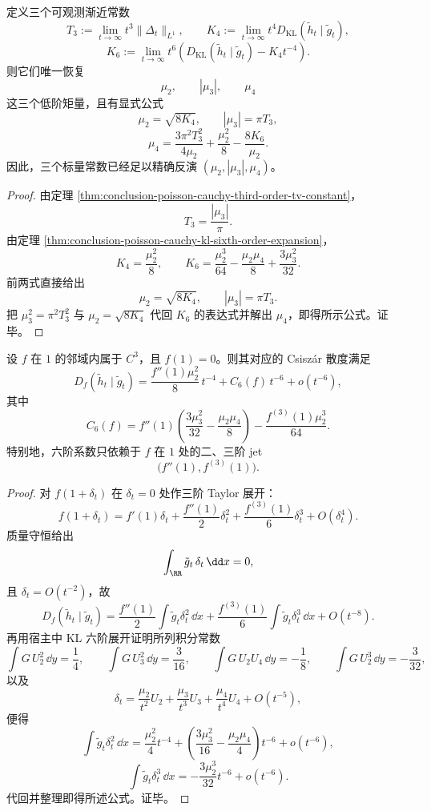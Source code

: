 \begin{theorem}[\((T_3,K_4,K_6)\) 的三常数精确层析]\label{thm:conclusion-poisson-cauchy-three-constant-moment-tomography}
定义三个可观测渐近常数
\[
T_3:=\lim_{t\to\infty}t^3\|\Delta_t\|_{L^1},
\qquad
K_4:=\lim_{t\to\infty}t^4D_{\mathrm{KL}}(\tilde h_t\mid \tilde g_t),
\]
\[
K_6:=\lim_{t\to\infty}t^6\left(D_{\mathrm{KL}}(\tilde h_t\mid \tilde g_t)-K_4t^{-4}\right).
\]
则它们唯一恢复
\[
\mu_2,\qquad |\mu_3|,\qquad \mu_4
\]
这三个低阶矩量，且有显式公式
\[
\mu_2=\sqrt{8K_4},
\qquad
|\mu_3|=\pi T_3,
\]
\[
\mu_4
=
\frac{3\pi^2T_3^2}{4\mu_2}
+\frac{\mu_2^2}{8}
-\frac{8K_6}{\mu_2}.
\]
因此，三个标量常数已经足以精确反演 \((\mu_2,|\mu_3|,\mu_4)\)。
\end{theorem}
\begin{proof}
由定理 \ref{thm:conclusion-poisson-cauchy-third-order-tv-constant}，
\[
T_3=\frac{|\mu_3|}{\pi}.
\]
由定理 \ref{thm:conclusion-poisson-cauchy-kl-sixth-order-expansion}，
\[
K_4=\frac{\mu_2^2}{8},
\qquad
K_6=\frac{\mu_2^3}{64}-\frac{\mu_2\mu_4}{8}+\frac{3\mu_3^2}{32}.
\]
前两式直接给出
\[
\mu_2=\sqrt{8K_4},
\qquad
|\mu_3|=\pi T_3.
\]
把 \(\mu_3^2=\pi^2T_3^2\) 与 \(\mu_2=\sqrt{8K_4}\) 代回 \(K_6\) 的表达式并解出 \(\mu_4\)，即得所示公式。证毕。
\end{proof}

\begin{theorem}\label{thm:conclusion-poisson-cauchy-c3-fdiv-sixth-jet-affine-law}
设 \(f\) 在 \(1\) 的邻域内属于 \(C^3\)，且 \(f(1)=0\)。则其对应的 Csisz\'ar 散度满足
\[
D_f(\tilde h_t\mid \tilde g_t)
=
\frac{f''(1)\mu_2^2}{8}\,t^{-4}
+C_6(f)\,t^{-6}
+o(t^{-6}),
\]
其中
\[
C_6(f)
=
f''(1)\left(\frac{3\mu_3^2}{32}-\frac{\mu_2\mu_4}{8}\right)
-\frac{f^{(3)}(1)\mu_2^3}{64}.
\]
特别地，六阶系数只依赖于 \(f\) 在 \(1\) 处的二、三阶 jet
\[
\bigl(f''(1),f^{(3)}(1)\bigr).
\]
\end{theorem}
\begin{proof}
对 \(f(1+\delta_t)\) 在 \(\delta_t=0\) 处作三阶 Taylor 展开：
\[
f(1+\delta_t)
=
f'(1)\delta_t+\frac{f''(1)}{2}\delta_t^2+\frac{f^{(3)}(1)}{6}\delta_t^3+O(\delta_t^4).
\]
质量守恒给出
\[
\int_{\RR}\tilde g_t\,\delta_t\,\dd x=0,
\]
且 \(\delta_t=O(t^{-2})\)，故
\[
D_f(\tilde h_t\mid \tilde g_t)
=
\frac{f''(1)}{2}\int \tilde g_t\delta_t^2\,\dd x
+\frac{f^{(3)}(1)}{6}\int \tilde g_t\delta_t^3\,\dd x
+O(t^{-8}).
\]
再用宿主中 KL 六阶展开证明所列积分常数
\[
\int G\,U_2^2\,\dd y=\frac14,\qquad
\int G\,U_3^2\,\dd y=\frac{3}{16},\qquad
\int G\,U_2U_4\,\dd y=-\frac18,\qquad
\int G\,U_2^3\,\dd y=-\frac{3}{32},
\]
以及
\[
\delta_t=\frac{\mu_2}{t^2}U_2+\frac{\mu_3}{t^3}U_3+\frac{\mu_4}{t^4}U_4+O(t^{-5}),
\]
便得
\[
\int \tilde g_t\delta_t^2\,\dd x
=
\frac{\mu_2^2}{4}t^{-4}
+\left(\frac{3\mu_3^2}{16}-\frac{\mu_2\mu_4}{4}\right)t^{-6}
+o(t^{-6}),
\]
\[
\int \tilde g_t\delta_t^3\,\dd x
=
-\frac{3\mu_2^3}{32}t^{-6}+o(t^{-6}).
\]
代回并整理即得所述公式。证毕。
\end{proof}

